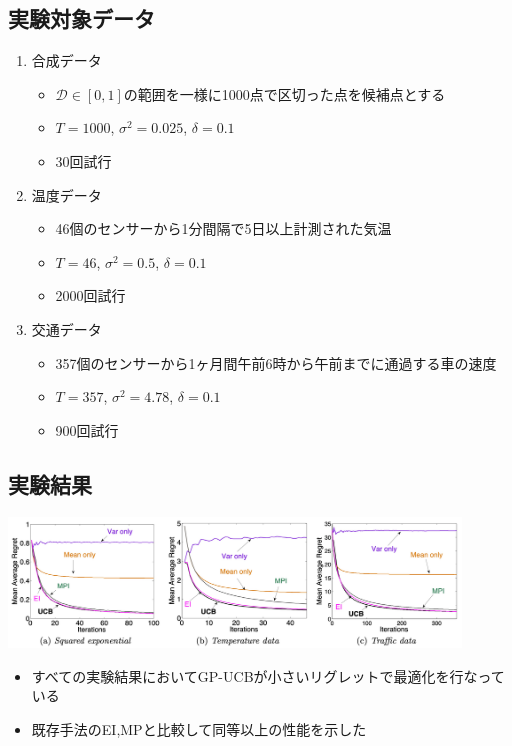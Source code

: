 \documentclass[dvipdfmx, 10.5pt]{beamer}
\begin{document}
\subsection{実験対象データ}
\begin{frame}{\insertsubsection}
	\begin{enumerate}
		\item 合成データ
		\begin{itemize}
			\item $\mathcal{D} \in [0,1]$の範囲を一様に1000点で区切った点を候補点とする
			\item $T = 1000$, $\sigma^2 = 0.025$, $\delta = 0.1$
			\item 30回試行
		\end{itemize}
		\vspace{5pt}
		\item 温度データ
		\begin{itemize}
			\item 46個のセンサーから1分間隔で5日以上計測された気温
			\item $T = 46$, $\sigma^2 = 0.5$, $\delta = 0.1$
			\item 2000回試行
		\end{itemize}
		\vspace{5pt}
		\item 交通データ
		\begin{itemize}
			\item 357個のセンサーから1ヶ月間午前6時から午前までに通過する車の速度
			\item $T = 357$, $\sigma^2 = 4.78$, $\delta = 0.1$
			\item 900回試行
		\end{itemize}
	\end{enumerate}
\end{frame}


\subsection{実験結果}

\begin{frame}{\insertsubsection}
	\begin{center}
		\includegraphics[width=0.90\textwidth]{./Fig/Figure4.pdf}
	\end{center}
	\begin{itemize}
		\item すべての実験結果においてGP-UCBが小さいリグレットで最適化を行なっている
		\item \textcolor{myorange}{既存手法のEI,MPと比較して同等以上の性能を示した}
	\end{itemize}

\end{frame}
\end{document}
